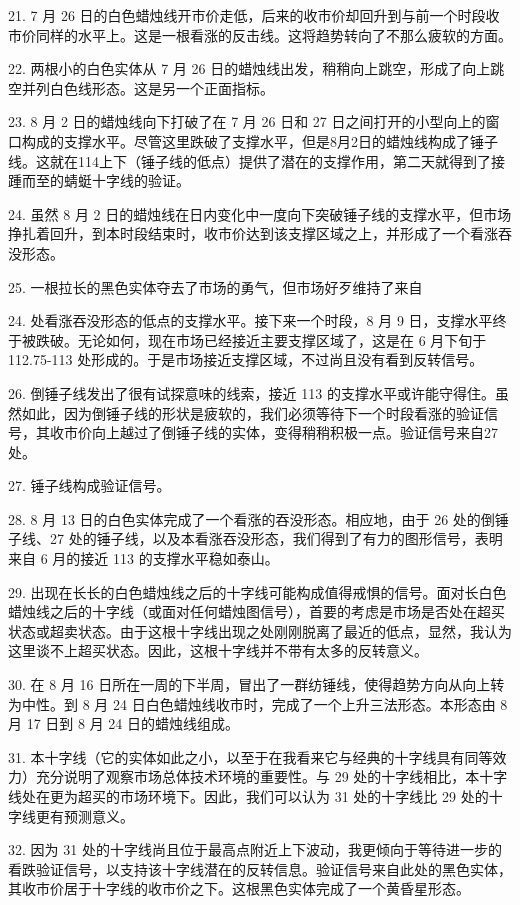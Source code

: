 21. 7 月 26 日的白色蜡烛线开市价走低，后来的收市价却回升到与前一个时段收市价同样的水平上。这是一根看涨的反击线。这将趋势转向了不那么疲软的方面。

22. 两根小的白色实体从 7 月 26 日的蜡烛线出发，稍稍向上跳空，形成了向上跳空并列白色线形态。这是另一个正面指标。

23. 8 月 2 日的蜡烛线向下打破了在 7 月 26 日和 27 日之间打开的小型向上的窗口构成的支撑水平。尽管这里跌破了支撑水平，但是8月2日的蜡烛线构成了锤子线。这就在114上下（锤子线的低点）提供了潜在的支撑作用，第二天就得到了接踵而至的蜻蜓十字线的验证。

24. 虽然 8 月 2 日的蜡烛线在日内变化中一度向下突破锤子线的支撑水平，但市场挣扎着回升，到本时段结束时，收市价达到该支撑区域之上，并形成了一个看涨吞没形态。

25. 一根拉长的黑色实体夺去了市场的勇气，但市场好歹维持了来自

24. 处看涨吞没形态的低点的支撑水平。接下来一个时段，8 月 9 日，支撑水平终于被跌破。无论如何，现在市场已经接近主要支撑区域了，这是在 6 月下旬于 112.75-113 处形成的。于是市场接近支撑区域，不过尚且没有看到反转信号。

26. 倒锤子线发出了很有试探意味的线索，接近 113 的支撑水平或许能守得住。虽然如此，因为倒锤子线的形状是疲软的，我们必须等待下一个时段看涨的验证信号，其收市价向上越过了倒锤子线的实体，变得稍稍积极一点。验证信号来自27处。

27. 锤子线构成验证信号。

28. 8 月 13 日的白色实体完成了一个看涨的吞没形态。相应地，由于 26 处的倒锤子线、27 处的锤子线，以及本看涨吞没形态，我们得到了有力的图形信号，表明来自 6 月的接近 113 的支撑水平稳如泰山。

29. 出现在长长的白色蜡烛线之后的十字线可能构成值得戒惧的信号。面对长白色蜡烛线之后的十字线（或面对任何蜡烛图信号），首要的考虑是市场是否处在超买状态或超卖状态。由于这根十字线出现之处刚刚脱离了最近的低点，显然，我认为这里谈不上超买状态。因此，这根十字线并不带有太多的反转意义。

30. 在 8 月 16 日所在一周的下半周，冒出了一群纺锤线，使得趋势方向从向上转为中性。到 8 月 24 日白色蜡烛线收市时，完成了一个上升三法形态。本形态由 8 月 17 日到 8 月 24 日的蜡烛线组成。

31. 本十字线（它的实体如此之小，以至于在我看来它与经典的十字线具有同等效力）充分说明了观察市场总体技术环境的重要性。与 29 处的十字线相比，本十字线处在更为超买的市场环境下。因此，我们可以认为 31 处的十字线比 29 处的十字线更有预测意义。

32. 因为 31 处的十字线尚且位于最高点附近上下波动，我更倾向于等待进一步的看跌验证信号，以支持该十字线潜在的反转信息。验证信号来自此处的黑色实体，其收市价居于十字线的收市价之下。这根黑色实体完成了一个黄昏星形态。

